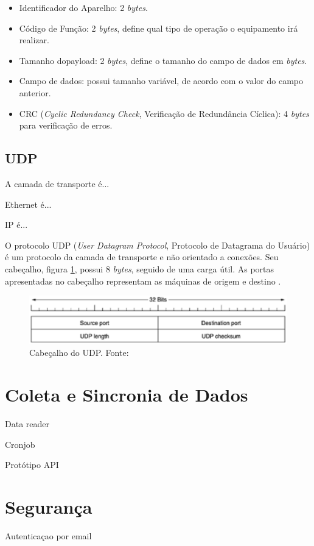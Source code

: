     \begin{itemize}
        \item Identificador do Aparelho: 2 \textit{bytes}.
        \item Código de Função: 2 \textit{bytes}, define qual tipo de operação o equipamento irá realizar.
        \item Tamanho do{payload}: 2 \textit{bytes}, define o tamanho do campo de dados em \textit{bytes}.
        \item Campo de dados: possui tamanho variável, de acordo com o valor do campo anterior.
        \item CRC (\textit{Cyclic Redundancy Check}, Verificação de Redundância Cíclica): 4 \textit{bytes} para verificação de erros.
    \end{itemize}

    \subsection{UDP}
    A camada de transporte é...

    Ethernet é...

    IP é...

    O protocolo UDP (\textit{User Datagram Protocol}, Protocolo de Datagrama do Usuário) é um protocolo da camada de transporte e não orientado a conexões. Seu cabeçalho, figura \ref{udp_header}, possui 8 \textit{bytes}, seguido de uma carga útil. As portas apresentadas no cabeçalho representam as máquinas de origem e destino \cite{tanenbaum_2002}.

    \begin{figure}[!htpb]
        \centering
        \includegraphics[keepaspectratio=true,scale=0.8]{figuras/udp_header.eps}
        \caption{Cabeçalho do UDP. Fonte: \cite{tanenbaum_2002}}
        \label{udp_header}
    \end{figure}

\section{Coleta e Sincronia de Dados}
Data reader

Cronjob

Protótipo API
\section{Segurança}
Autenticaçao por email

